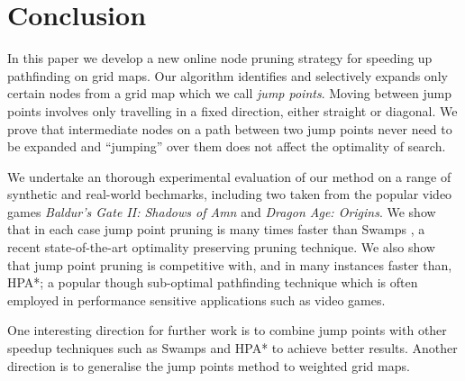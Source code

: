 \section{Conclusion}
In this paper we develop a new online node pruning
strategy for speeding up pathfinding on grid maps.
Our algorithm identifies and selectively expands only certain
nodes from a grid map which we call \emph{jump points}.
Moving between jump points involves only travelling in a
fixed direction, either straight or diagonal.
We prove that intermediate nodes on a path between two
jump points never need to be expanded and ``jumping'' over them
does not affect the optimality of search.
\par
We undertake an thorough experimental evaluation of our method on
a range of synthetic and real-world bechmarks, including two taken
from the popular video games \emph{Baldur's Gate II: Shadows of Amn}
and \emph{Dragon Age: Origins}.
We show that in each case jump point pruning is many times faster 
than Swamps \cite{pochter10}, a recent state-of-the-art optimality preserving
pruning technique.
We also show that jump point pruning is competitive with, and in many instances
faster than, HPA*; a popular though sub-optimal pathfinding technique which is 
often employed in performance sensitive applications such as video games.
\par
One interesting direction for further work is to combine jump points with other
speedup techniques such as Swamps and HPA* to achieve better results.
Another direction is to generalise the jump points method to weighted grid maps.
